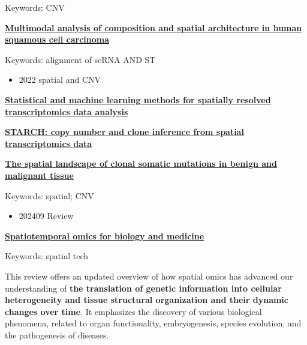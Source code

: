 \documentclass[
]{book}
\providecommand{\tightlist}{%
  \setlength{\itemsep}{0pt}\setlength{\parskip}{0pt}}
\begin{document}
Keywords: CNV

\textbf{\href{https://www.sciencedirect.com/science/article/pii/S0092867420306723}{Multimodal analysis of composition and spatial architecture in human squamous cell carcinoma}\citep{zhang2021supergnova}}

Keywords: alignment of scRNA AND ST

\begin{itemize}
\tightlist
\item
  2022 spatial and CNV
\end{itemize}

\textbf{\href{https://genomebiology.biomedcentral.com/articles/10.1186/s13059-022-02653-7}{Statistical and machine learning methods for spatially resolved transcriptomics data analysis}\citep{zeng2022statistical}}

\textbf{\href{https://pubmed.ncbi.nlm.nih.gov/33022659/}{STARCH: copy number and clone inference from spatial transcriptomics data}\citep{elyanow2021starch}}

\textbf{\href{https://www.biorxiv.org/content/10.1101/2021.07.12.452018v1.abstract}{The spatial landscape of clonal somatic mutations in benign and malignant tissue}\citep{erickson2021spatial}}

Keywords: spatial; CNV

\begin{itemize}
\tightlist
\item
  202409 Review
\end{itemize}

\textbf{\href{https://www.cell.com/cell/fulltext/S0092-8674(24)00834-1}{Spatiotemporal omics for biology and medicine}\citep{liu2024spatiotemporal}}

Keywords: spatial tech

This review offers an updated overview of how spatial omics has advanced our understanding of \textbf{the translation of genetic information into cellular heterogeneity and tissue structural organization and their dynamic changes over time}. It emphasizes the discovery of various biological phenomena, related to organ functionality, embryogenesis, species evolution, and the pathogenesis of diseases.
\end{document}
